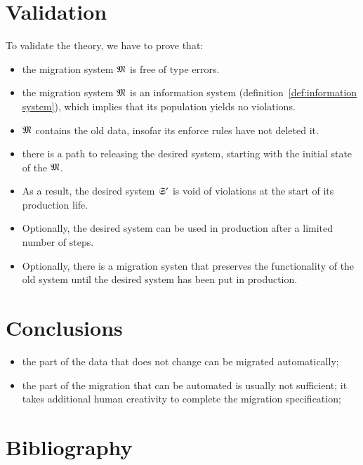\documentclass{elsarticle}
\begin{document}
\section{Validation}
   To validate the theory, we have to prove that:
\begin{itemize}
   \item the migration system $\mathfrak{M}$ is free of type errors.
   \item the migration system $\mathfrak{M}$ is an information system (definition~\ref{def:information system}),
         which implies that its population yields no violations.
   \item $\mathfrak{M}$ contains the old data, insofar its enforce rules have not deleted it.
   \item there is a path to releasing the desired system, starting with the initial state of the $\mathfrak{M}$.
   \item As a result, the desired system $\mathfrak{S}'$ is void of violations at the start of its production life.
   \item Optionally, the desired system can be used in production after a limited number of steps.
   \item Optionally, there is a migration systen that preserves the functionality of the old system until the desired system has been put in production.
\end{itemize}

\section{Conclusions}
\begin{itemize}
   \item the part of the data that does not change can be migrated automatically;
   \item the part of the migration that can be automated is usually not sufficient;
         it takes additional human creativity to complete the migration specification;
\end{itemize}
\section{Bibliography}


\end{document}
